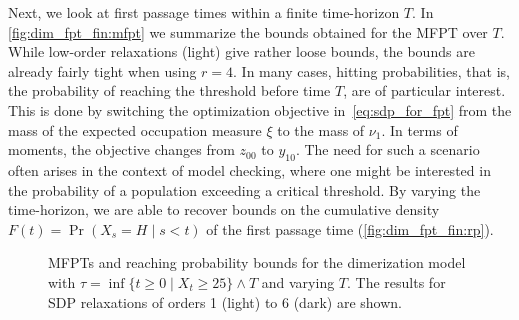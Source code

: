 Next, we look at first passage times within a finite time-horizon $T$.
In \autoref{fig:dim_fpt_fin:mfpt} we summarize the bounds obtained for the \ac{MFPT} over $T$.
While low-order relaxations (light) give rather loose bounds, the bounds are already fairly tight
when using $r=4$.
In many cases, hitting probabilities, that is, the probability of reaching the
threshold before time $T$, are of particular interest.
This is done by switching the optimization objective in~\eqref{eq:sdp_for_fpt} from the mass of the
expected occupation measure $\xi$ to the mass of $\nu_1$.
In terms of moments, the objective changes from $z_{00}$ to $y_{10}$.
The need for such a scenario often arises in the context of model checking, where one might be
interested in the probability of a population exceeding a critical threshold.
By varying the time-horizon, we are able to recover bounds on the cumulative density $F(t) = \Pr(X_s=H\mid s<t)$ of
the first passage time (\autoref{fig:dim_fpt_fin:rp}).
\begin{figure}
    \myfloatalign
	\caption[\acp{MFPT} up to a varying time-horizon]{\Acp{MFPT} and reaching probability bounds for the dimerization model with
    $\tau=\inf\{t\geq 0\mid X_t \geq 25\}\land T$ and varying $T$.
    The results for \ac{SDP} relaxations of orders 1 (light) to 6 (dark) are shown.\label{fig:dim_fpt_fin}}
\end{figure}
